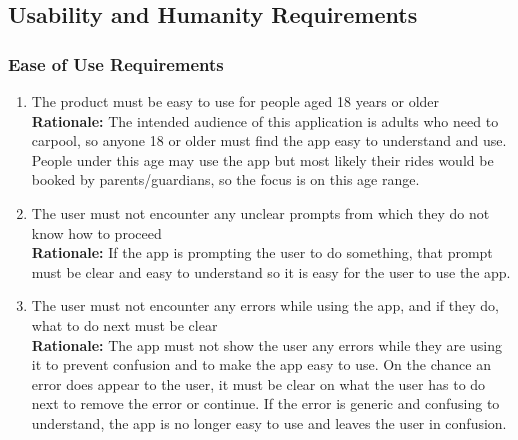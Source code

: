 \documentclass[]{article}
\begin{document}

\subsection{Usability and Humanity Requirements}
\label{sub:usability_and_humanity_requirements}

\subsubsection{Ease of Use Requirements}
\label{ssub:ease_of_use_requirements}
\begin{enumerate}[{UH-EOU}1. ]
	\item The product must be easy to use for people aged 18 years or older \\
	{\bf Rationale:} The intended audience of this application is adults who need to carpool, so anyone 18 or older must find the app easy to understand and use. People under this age may use the app but most likely their rides would be booked by parents/guardians, so the focus is on this age range.
	\item The user must not encounter any unclear prompts from which they do not know how to proceed \\
	{\bf Rationale:} If the app is prompting the user to do something, that prompt must be clear and easy to understand so it is easy for the user to use the app.
	\item The user must not encounter any errors while using the app, and if they do, what to do next must be clear \\
	{\bf Rationale:} The app must not show the user any errors while they are using it to prevent confusion and to make the app easy to use. On the chance an error does appear to the user, it must be clear on what the user has to do next to remove the error or continue. If the error is generic and confusing to understand, the app is no longer easy to use and leaves the user in confusion.
\end{enumerate}
\end{document}
